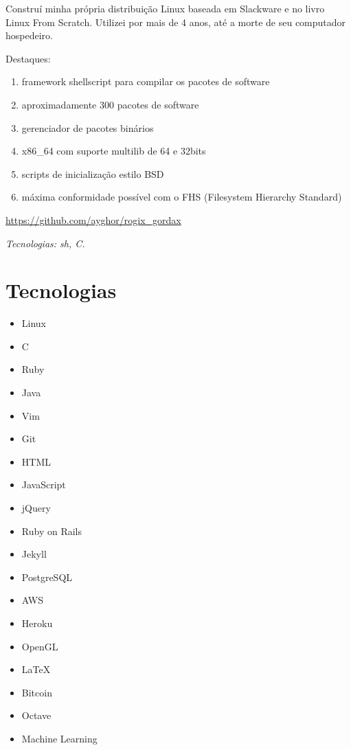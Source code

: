 \documentclass[a4paper]{simplecv}
\begin{document}
\begin{topic}
	Construí minha própria distribuição Linux baseada em Slackware e no
	livro Linux From Scratch. Utilizei por mais de 4 anos, até a morte de
	seu computador hospedeiro.

	Destaques:

	\begin{enumerate}
		\item framework shellscript para compilar os pacotes de
			software

		\item aproximadamente 300 pacotes de software

		\item gerenciador de pacotes binários

		\item x86\_64 com suporte multilib de 64 e 32bits

		\item scripts de inicialização estilo BSD

		\item máxima conformidade possível com o FHS (Filesystem
			Hierarchy Standard)
	\end{enumerate}

	{\scriptsize\url{https://github.com/ayghor/rogix\_gordax}}

	{\em\scriptsize Tecnologias: sh, C.}

\end{topic}

\section{Tecnologias}

\begin{multicols}{3}
	\raggedcolumns
	\begin{itemize}
		\item Linux
		\item C
		\item Ruby
		\item Java
		\item Vim
		\item Git
		\item HTML
		\item JavaScript
		\item jQuery
		\item Ruby on Rails
		\item Jekyll
		\item PostgreSQL
		\item AWS
		\item Heroku
		\item OpenGL
		\item \LaTeX{}
		\item Bitcoin
		\item Octave
		\item Machine Learning
	\end{itemize}
\end{multicols}
\end{document}
